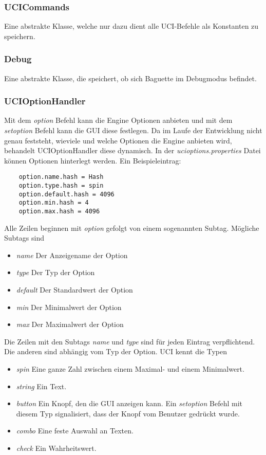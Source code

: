 \subsubsection{UCICommands}\label{subsubsec:ucicommands}
Eine abstrakte Klasse, welche nur dazu dient alle UCI-Befehle als Konstanten zu speichern.

\subsubsection{Debug}\label{subsubsec:debug}
Eine abstrakte Klasse, die speichert, ob sich Baguette im Debugmodus befindet.

\subsubsection{UCIOptionHandler}\label{subsubsec:ucioptionhandler}
Mit dem \textit{option} Befehl kann die Engine Optionen anbieten und mit dem \textit{setoption} Befehl kann die GUI
diese festlegen.
Da im Laufe der Entwicklung nicht genau feststeht, wieviele und welche Optionen die Engine anbieten wird, behandelt
UCIOptionHandler diese dynamisch.
\newline
In der \textit{ucioptions.properties} Datei k\"onnen Optionen hinterlegt werden.\newline
Ein Beispieleintrag:\newline
\begin{lstlisting}
    option.name.hash = Hash
    option.type.hash = spin
    option.default.hash = 4096
    option.min.hash = 4
    option.max.hash = 4096
\end{lstlisting}
Alle Zeilen beginnen mit \textit{option} gefolgt von einem sogenannten Subtag.
M\"ogliche Subtags sind
\begin{itemize}
    \item \textit{name}
        Der Anzeigename der Option
    \item \textit{type}
        Der Typ der Option
    \item \textit{default}
        Der Standardwert der Option
    \item \textit{min}
        Der Minimalwert der Option
    \item \textit{max}
        Der Maximalwert der Option
\end{itemize}
Die Zeilen mit den Subtags \textit{name} und \textit{type} sind f\"ur jeden Eintrag verpflichtend.
Die anderen sind abh\"angig vom Typ der Option.
UCI kennt die Typen
\begin{itemize}
    \item \textit{spin}
        Eine ganze Zahl zwischen einem Maximal- und einem Minimalwert.
    \item \textit{string}
        Ein Text.
    \item \textit{button}
        Ein Knopf, den die GUI anzeigen kann.
        Ein \textit{setoption} Befehl mit diesem Typ signalisiert, dass der Knopf vom Benutzer gedr\"uckt wurde.
    \item \textit{combo}
        Eine feste Auswahl an Texten.
    \item \textit{check}
        Ein Wahrheitswert.
\end{itemize}
